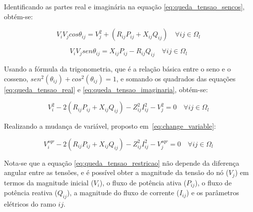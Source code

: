 Identificando as partes real e imaginária na equação \eqref{eq:queda_tensao_sencos}, obtém-se:

\begin{equation}
    V_{i}V_{j}cos\theta_{ij} = V_{j}^{2} + (R_{ij}P_{ij} + X_{ij}Q_{ij})\quad\forall ij \in \Omega_{l}
    \label{eq:queda_tensao_real}
\end{equation}

\begin{equation}
    V_{i}V_{j}sen\theta_{ij} = X_{ij}P_{ij} - R_{ij}Q_{ij}\quad\forall ij \in \Omega_{l}
    \label{eq:queda_tensao_imaginaria}
\end{equation}

Usando a fórmula da trigonometria, que é a relação básica entre o seno e o cosseno, $sen^{2}(\theta_{ij}) + cos^{2}(\theta_{ij}) = 1$, e somando os quadrados das equações \eqref{eq:queda_tensao_real} e \eqref{eq:queda_tensao_imaginaria}, obtém-se:

\begin{equation}
    V_{i}^{2} - 2(R_{ij}P_{ij} + X_{ij}Q_{ij}) - Z_{ij}^{2}I_{ij}^{2} - V_{j}^{2} = 0\quad\forall ij \in \Omega_{l}
\end{equation}

Realizando a mudança de variável, proposto em~\eqref{eq:change_variable}:

\begin{equation}\label{eq:queda_tensao_restricao}
    V_{i}^{sqr} - 2(R_{ij}P_{ij} + X_{ij}Q_{ij}) - Z_{ij}^{2}I_{ij}^{2} - V_{j}^{sqr} = 0\quad\forall ij \in \Omega_{l}
\end{equation}

Nota-se que a equação \eqref{eq:queda_tensao_restricao} não depende da diferença angular entre as tensões, e é possível obter a magnitude da tensão do nó ($V_j$) em termos da magnitude inicial ($V_i$), o fluxo de potência ativa ($P_{ij}$), o fluxo de potência reativa ($Q_{ij}$), a magnitude do fluxo de corrente ($I_{ij}$) e os parâmetros elétricos do ramo $ij$.
